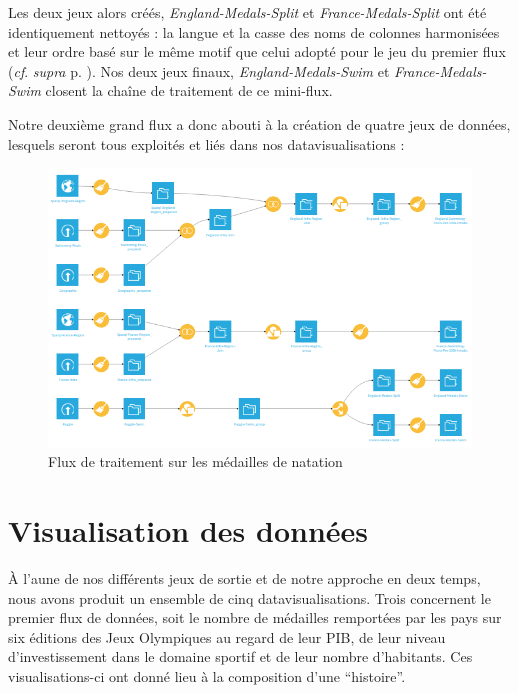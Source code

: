 \documentclass[hidelinks, 12pt]{report}
\begin{document}
Les deux jeux alors créés, \textit{England-Medals-Split} et \textit{France-Medals-Split} ont été identiquement nettoyés : la langue et la casse des noms de colonnes harmonisées et leur ordre basé sur le même motif que celui adopté pour le jeu du premier flux (\textit{cf}. \textit{supra} p. \pageref{orga}). Nos deux jeux finaux, \textit{England-Medals-Swim} et \textit{France-Medals-Swim} closent la chaîne de traitement de ce mini-flux.

Notre deuxième grand flux a donc abouti à la création de quatre jeux de données, lesquels seront tous exploités et liés dans nos datavisualisations :

\begin{center}
	\begin{figure}[H]
		\centering
		\setlength{\belowcaptionskip}{-35pt}
		\includegraphics[scale=0.5]{images/flow-swim-full.png}
		\caption{Flux de traitement sur les médailles de natation}
	\end{figure}
\end{center}





%





\chapter{Visualisation des données}

À l'aune de nos différents jeux de sortie et de notre approche en deux temps, nous avons produit un ensemble de cinq datavisualisations. Trois concernent le premier flux de données, soit le nombre de médailles remportées par les pays sur six éditions des Jeux Olympiques au regard de leur PIB, de leur niveau d'investissement dans le domaine sportif et de leur nombre d'habitants. Ces visualisations-ci ont donné lieu à la composition d'une \enquote{histoire}.
\end{document}

